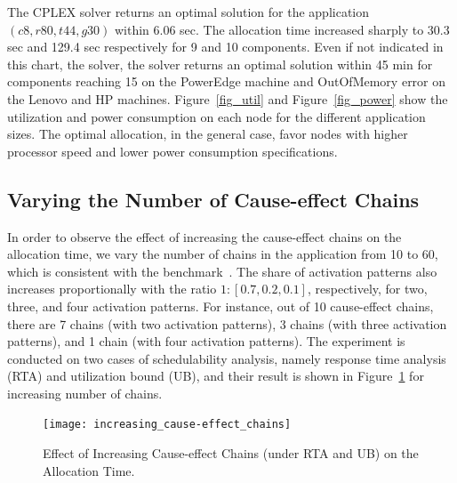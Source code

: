 The CPLEX solver returns an optimal solution for the application $(c8, r80,t44,g30)$ within 6.06 sec. The allocation time increased sharply to 30.3 sec and 129.4 sec respectively for 9 and 10 components. Even if not indicated in this chart, the solver, the solver returns an optimal solution within 45 min for components reaching 15 on the PowerEdge machine and OutOfMemory error on the Lenovo and HP machines. Figure~\ref{fig_util} and Figure~\ref{fig_power} show the utilization and power consumption on each node for the different application sizes. The optimal allocation, in the general case, favor nodes with higher processor speed and lower power consumption specifications.

\subsection{Varying the Number of Cause-effect Chains} 
In order to observe the effect of increasing the cause-effect chains on the allocation time, we vary the number of chains in the application from 10 to 60, which is consistent with the benchmark~\cite{Kramer2015RealFree}. The share of activation patterns also increases proportionally with the ratio $1:[0.7, 0.2, 0.1]$, respectively, for two, three, and four activation patterns. For instance, out of 10 cause-effect chains, there are 7 chains (with two activation patterns), 3 chains (with three activation patterns), and 1 chain (with four activation patterns). The experiment is conducted on two cases of schedulability analysis, namely response time analysis (RTA) and utilization bound (UB), and their result is shown in  Figure~\ref{chart_cause_effect_chain} for increasing number of chains.
\begin{figure}[h!]
\centering
\texttt{[image: increasing\_cause-effect\_chains]}
\caption{Effect of Increasing Cause-effect Chains (under RTA and UB) on the Allocation Time.}
\label{chart_cause_effect_chain}\vspace{-0.4cm}
\end{figure}

